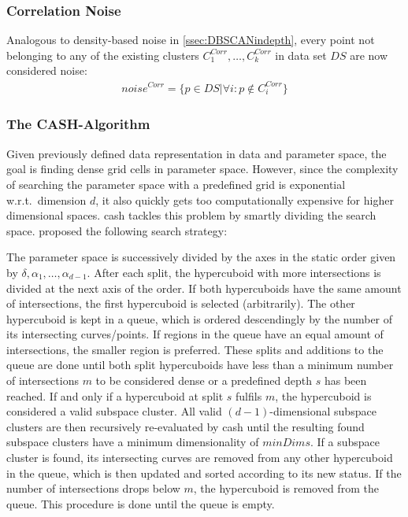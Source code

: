 \subsubsection*{Correlation Noise}
Analogous to density-based noise in \autoref{ssec:DBSCANindepth}, every point not belonging to any of the existing clusters $C^{Corr}_1, \dotsc, C^{Corr}_k$ in data set $DS$ are now considered noise: 
\begin{align}
    noise^{Corr} = \{p \in  DS | \forall i : p \notin C^{Corr}_i\}
\end{align}

\subsubsection*{The CASH-Algorithm}
Given previously defined data representation in data and parameter space, the goal is finding dense grid cells in parameter space. However, since the complexity of searching the parameter space with a predefined grid is exponential w.r.t.\ dimension $d$, it also quickly gets too computationally expensive for higher dimensional spaces. \gls{cash} tackles this problem by smartly dividing the search space. \citeauthor{CASHachtert2008robust} proposed the following search strategy:
\vspace{5mm}

The parameter space is successively divided by the axes in the static order given by $\delta,\alpha_1,\dotsc,\alpha_{d-1}$. After each split, the hypercuboid with more intersections is divided at the next axis of the order. If both hypercuboids have the same amount of intersections, the first hypercuboid is selected (arbitrarily). The other hypercuboid is kept in a queue, which is ordered descendingly by the number of its intersecting curves/points. If regions in the queue have an equal amount of intersections, the smaller region is preferred. These splits and additions to the queue are done until both split hypercuboids have less than a minimum number of intersections $m$ to be considered dense or a predefined depth $s$ has been reached. If and only if a hypercuboid at split $s$ fulfils $m$, the hypercuboid is considered a valid subspace cluster.
All valid $(d-1)$-dimensional subspace clusters are then recursively re-evaluated by \gls{cash} until the resulting found subspace clusters have a minimum dimensionality of $minDims$. If a subspace cluster is found, its intersecting curves are removed from any other hypercuboid in the queue, which is then updated and sorted according to its new status. If the number of intersections drops below $m$, the hypercuboid is removed from the queue. This procedure is done until the queue is empty.

